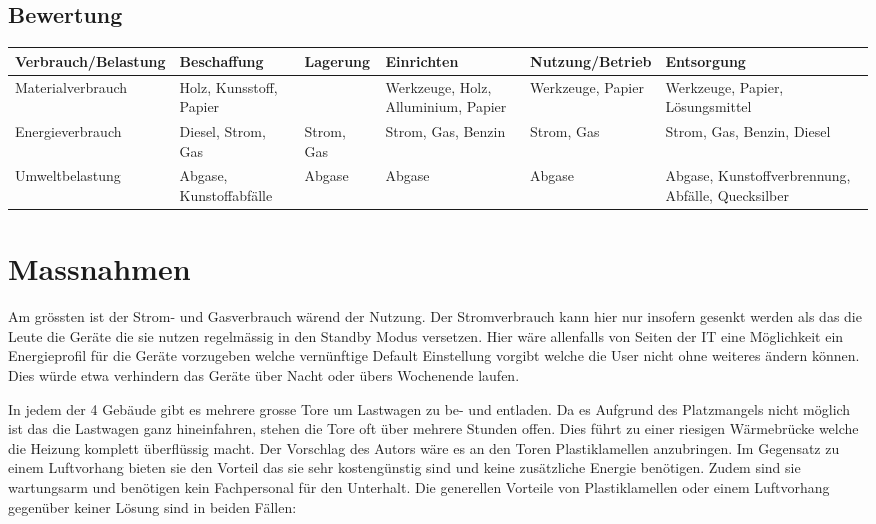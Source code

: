 \begin{landscape}
\section{Bewertung}
\vfill
\begin{table}[h]
    \begin{tabular}{ |m{3.5cm}|m{2.5cm}|m{2.5cm}|m{3cm}|m{3cm}|m{3.5cm}| }
\hline
\rowcolor[gray]{0.9}\textbf{Verbrauch/Belastung} & \textbf{Beschaffung} &
\textbf{Lagerung} & 
\textbf{Einrichten} & \textbf{Nutzung/Betrieb} & \textbf{Entsorgung} \\ \hline
Materialverbrauch & \cellcolor{orange}Holz, Kunsstoff, Papier & \cellcolor{green}&
\cellcolor{yellow}Werkzeuge, Holz, Alluminium, Papier & \cellcolor{orange}Werkzeuge,
Papier & \cellcolor{yellow}Werkzeuge, Papier, Lösungsmittel \\ \hline
Energieverbrauch & \cellcolor{yellow}Diesel, Strom, Gas &
\cellcolor{orange}Strom, Gas & \cellcolor{yellow}Strom, Gas, Benzin &
\cellcolor{red}Strom, Gas
& \cellcolor{orange}Strom, Gas, Benzin, Diesel\\ \hline
Umweltbelastung & \cellcolor{orange}Abgase, Kunstoffabfälle & \cellcolor{yellow}Abgase &
\cellcolor{yellow}Abgase & \cellcolor{red}Abgase
& \cellcolor{red}Abgase, Kunstoffverbrennung, Abfälle, Quecksilber \\
\hline
\end{tabular}
\end{table}
\vfill
\end{landscape}

\section{Massnahmen}
Am grössten ist der Strom- und Gasverbrauch wärend der Nutzung. Der
Stromverbrauch kann hier nur insofern gesenkt werden als das die Leute die
Geräte die sie nutzen regelmässig in den Standby Modus versetzen. Hier wäre
allenfalls von Seiten der IT eine Möglichkeit ein Energieprofil für die
Geräte vorzugeben welche vernünftige Default Einstellung vorgibt welche die
User nicht ohne weiteres ändern können. Dies würde etwa verhindern das Geräte
über Nacht oder übers Wochenende laufen.

In jedem der 4 Gebäude gibt es mehrere grosse Tore um Lastwagen zu be-
und entladen. Da es Aufgrund des Platzmangels nicht möglich ist das die
Lastwagen ganz hineinfahren, stehen die Tore oft über mehrere Stunden offen.
Dies führt zu einer riesigen Wärmebrücke welche die Heizung komplett überflüssig
macht. Der Vorschlag des Autors wäre es an den Toren Plastiklamellen
anzubringen. Im Gegensatz zu einem Luftvorhang bieten sie den Vorteil das sie
sehr kostengünstig sind und keine zusätzliche Energie benötigen. Zudem sind sie
wartungsarm und benötigen kein Fachpersonal für den Unterhalt. 
Die generellen Vorteile von Plastiklamellen oder einem Luftvorhang gegenüber 
keiner Lösung sind in beiden Fällen:

